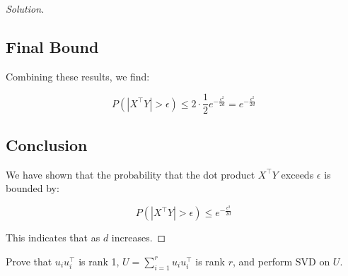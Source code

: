 \documentclass[12pt]{article}
\newenvironment{exercise}[2][Exercise]{\begin{trivlist}
\item[\hskip \labelsep {\bfseries #1}\hskip \labelsep {\bfseries #2.}]}{\end{trivlist}}
\newenvironment{solution}{\begin{proof}[Solution]}{\end{proof}}
\begin{document}
\begin{solution}
    \subsection*{Final Bound}
    
    Combining these results, we find:
    
    \[
    P(|X^\top Y| > \epsilon) \leq 2 \cdot \frac{1}{2} e^{-\frac{\epsilon^2}{2d}} = e^{-\frac{\epsilon^2}{2d}}
    \]
    
    \subsection*{Conclusion}
    
    We have shown that the probability that the dot product \( X^\top Y \) exceeds \( \epsilon \) is bounded by:
    
    \[
    P(|X^\top Y| > \epsilon) \leq e^{-\frac{\epsilon^2}{2d}}
    \]
    
    This indicates that as \( d \) increases.
    \end{solution}
    
    \newpage
    
    \begin{exercise}{4}
    Prove that $u_i u_i^\top$ is rank 1, $U = \sum_{i=1}^r u_i u_i^\top$ is rank $r$, and perform SVD on $U$.
    \end{exercise}
    
\end{document}
